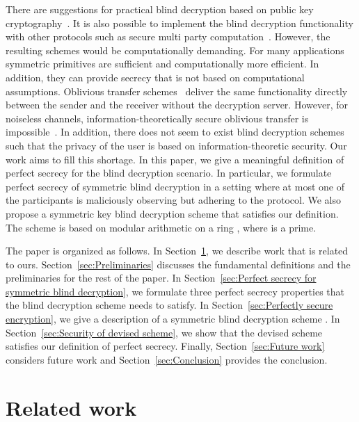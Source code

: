 \documentclass[10pt,journal]{IEEEtran}
\begin{document}
There are suggestions for practical blind decryption based on public key cryptography~\cite{Sakurai_1996,Sakurai_1998,Sameshima_1998,Ogata_2009,Green_2011}.
It is also possible to implement the blind decryption functionality with other protocols
such as secure multi party computation~\cite{Yao_1986}.
However, the resulting schemes would
be computationally demanding.
For many applications symmetric primitives are sufficient and
computationally more efficient.
In addition, they can provide secrecy that is not based on computational assumptions.
Oblivious transfer schemes~\cite{Rabin_1981,Even_1985} deliver the same functionality
directly between the sender and the receiver without the decryption server.
However, for noiseless channels, information-theoretically secure oblivious transfer is impossible~\cite{Damgard_1999}.
In addition, there does not seem to exist
blind decryption schemes such that the privacy of the user is based on information-theoretic security.
Our work aims to fill this shortage.
In this paper, we give a meaningful definition of perfect secrecy
for the blind decryption scenario.
In particular, we formulate
perfect secrecy of symmetric blind decryption
in a setting where at most one of the participants is maliciously observing
but adhering to the protocol.
We also propose
a
symmetric key blind decryption scheme  that satisfies
our definition.
The scheme is based on modular arithmetic on a ring , where 
is a prime.

The paper is organized as follows.
In Section~\ref{sec:Related work}, we describe work that is related to ours.
 Section~\ref{sec:Preliminaries} discusses the
fundamental definitions and the preliminaries for the rest of the paper.
In Section~\ref{sec:Perfect secrecy for symmetric blind decryption}, we formulate
three perfect secrecy properties that
the blind decryption scheme needs to satisfy.
In Section~\ref{sec:Perfectly secure encryption},
we give a description of a symmetric blind decryption scheme .
In Section~\ref{sec:Security of devised scheme}, we
show that the devised scheme
satisfies our definition of perfect secrecy.
Finally, Section~\ref{sec:Future work}
considers future work and Section~\ref{sec:Conclusion}
provides the conclusion.

\section{Related work}
\label{sec:Related work}
\end{document}

